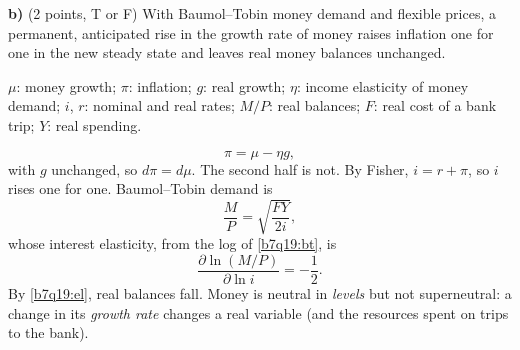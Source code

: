 \medskip
\textbf{b)} (2 points, T or F) With Baumol--Tobin money demand and flexible prices, a permanent, anticipated rise in the growth
rate of money raises inflation one for one in the new steady state and leaves real money balances unchanged.
\begin{sol}
\begin{notacao}
\item $\mu$: money growth; $\pi$: inflation; $g$: real growth; $\eta$: income elasticity of money demand; $i$, $r$: nominal and
real rates; $M/P$: real balances; $F$: real cost of a bank trip; $Y$: real spending.
\end{notacao}
\begin{equation}
\pi=\mu-\eta g, \label{b7q19:qt}
\end{equation}
with $g$ unchanged, so $d\pi=d\mu$. The second half is not. By Fisher, $i=r+\pi$, so $i$ rises one for one. Baumol--Tobin demand is
\begin{equation}
\frac MP=\sqrt{\frac{FY}{2i}}, \label{b7q19:bt}
\end{equation}
whose interest elasticity, from the log of \eqref{b7q19:bt}, is
\begin{equation}
\frac{\partial\ln(M/P)}{\partial\ln i}=-\frac12. \label{b7q19:el}
\end{equation}
By \eqref{b7q19:el}, real balances fall. Money is neutral in \emph{levels} but not superneutral:
a change in its \emph{growth rate} changes a real variable (and the resources spent on trips to the bank).
\end{sol}

